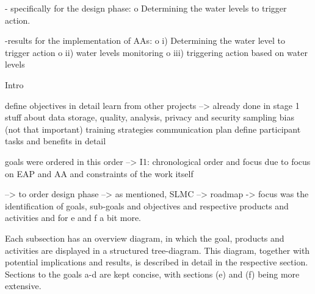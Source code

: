 - specifically for the design phase:
o	Determining the water levels to trigger action.

-results for the implementation of AAs:
o	i) Determining the water level to trigger action
o	ii) water levels monitoring
o	iii) triggering action based on water levels
























Intro

define objectives in detail
learn from other projects --> already done in stage 1
stuff about data storage, quality, analysis, privacy and security 
sampling bias (not that important)
training strategies
communication plan
define participant tasks and benefits in detail 

goals were ordered in this order --> I1: chronological order and focus due to focus on EAP and AA and constraints of the work itself





--> to order design phase --> as mentioned, SLMC
--> roadmap -> focus was the identification of goals, sub-goals and objectives and respective products and activities and for e and f a bit more. 



Each subsection has an overview diagram, in which the goal, products and activities are displayed in a structured tree-diagram. This diagram, together with potential implications and results, is described in detail in the respective section. Sections to the goals a-d are kept concise, with sections (e) and (f) being more extensive.



